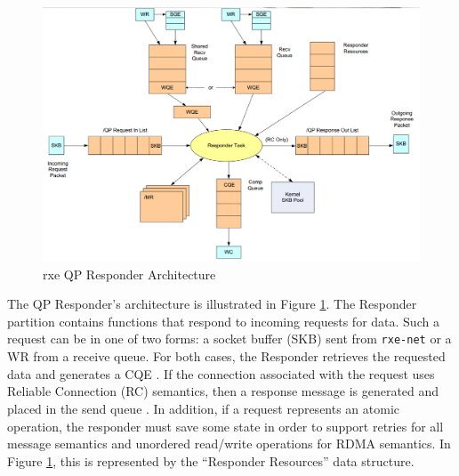 \documentclass[11pt]{book}
\begin{document}
\begin{figure}[!t]
\includegraphics[width=\textwidth]{rxe_resp}
\caption{rxe QP Responder Architecture \protect\cite{pearson-10}}\label{rxe-resp}
\end{figure}

The QP Responder's architecture is illustrated in Figure \ref{rxe-resp}.  The Responder
partition contains functions that respond to incoming requests for data.  Such a request
can be in one of two forms: a socket buffer (SKB) sent from \verb;rxe-net; or a WR from a
receive queue.  For both cases, the Responder retrieves the requested data and generates a
CQE \cite{pearson-10}.  If the connection associated with the request uses Reliable
Connection (RC) semantics, then a response message is generated and placed in the send
queue \cite{InfiniBandTARoCE-10,pearson-10}.  In addition, if a request represents an
atomic operation, the responder must save some state in order to support retries for all
message semantics and unordered read/write operations for RDMA semantics.  In Figure
\ref{rxe-resp}, this is represented by the ``Responder Resources'' data structure.
\end{document}
